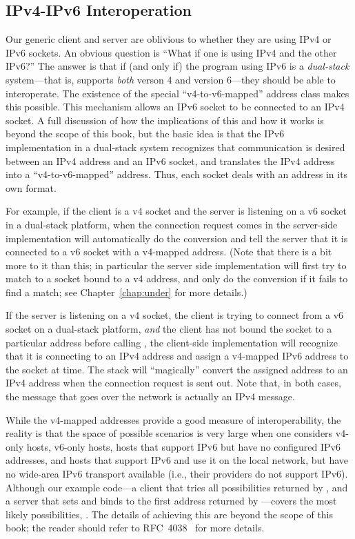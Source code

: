 \subsection{IPv4-IPv6 Interoperation}
%
Our generic client and server are oblivious to whether they are
using IPv4 or IPv6 sockets.
%
An obvious question is ``What if one is
using IPv4 and the other IPv6?''  The answer is that if
(and only if) the program
using IPv6 is a \emph{dual-stack\/} system---that is, supports
\emph{both\/} verson 4 and version 6---they should be able to interoperate.
%
The existence of the special ``v4-to-v6-mapped'' address class makes
this possible.  This mechanism allows an IPv6 socket to be connected to
an IPv4 socket.  A full discussion of how the implications of this and
how it works is beyond the scope of this book, but the basic idea is
that the IPv6 implementation in a dual-stack system recognizes that
communication is desired between an IPv4 address and an IPv6 socket,
and translates the IPv4 address into a ``v4-to-v6-mapped'' address.
Thus, each socket deals with an address in its own format.

For example, if the client is a v4 socket and the server is listening
on a v6 socket in a dual-stack platform, when the connection request
comes in the server-side implementation
will automatically do the conversion and tell the server
that it is connected to a v6 socket with a v4-mapped address.
(Note that there is a bit more to it than this; in particular the
server side implementation will first try to match to a socket bound
to a v4 address, and only do the conversion if it fails to find a
match; see Chapter~\ref{chap:under} for more details.)

If the server is listening on a v4 socket, the client is trying to
connect from a v6 socket on a dual-stack platform, \emph{and\/} the
client has not bound the socket to a particular address before calling
, the client-side
implementation will recognize that it is connecting to an IPv4 address
and assign a v4-mapped IPv6 address to the socket at  time.
The stack will ``magically'' convert the assigned address to an IPv4
address when the connection request is sent out.
%
Note  that, in both cases, the message that goes over the network is
actually an IPv4 message.

While the v4-mapped addresses provide a good measure of
interoperability, the reality is that the space of possible scenarios
is very large when one considers v4-only hosts, v6-only hosts, hosts
that support IPv6 but have no configured IPv6 addresses, and hosts
that support IPv6 and use it on the local network, but have no
wide-area  IPv6 transport available (i.e., their providers do not
support IPv6).   Although our example code---a client that
tries all possibilities returned by , and a server
that sets  and
binds to the first address returned by ---covers the
most likely possibilities, .  The details of achieving this are beyond the scope of
this book; the reader should 
refer to RFC~4038~\cite{RFC4038} for more details.

